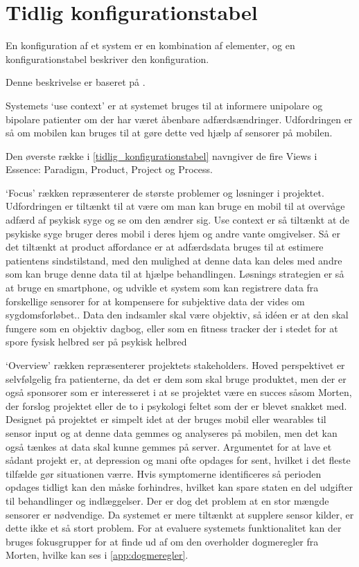 \section{Tidlig konfigurationstabel}
En konfiguration af et system er en kombination af elementer, og en konfigurationstabel beskriver den konfiguration.

Denne beskrivelse er baseret på  \citet[Afsnit 3.2, Side 16-21]{art:essence}.

Systemets `use context' er at systemet bruges til at informere unipolare og bipolare patienter om der har været åbenbare adfærdsændringer. Udfordringen er så om mobilen kan bruges til at gøre dette ved hjælp af sensorer på mobilen.

Den øverste række i \cref{tidlig_konfigurationstabel} navngiver de fire Views i Essence: Paradigm, Product, Project og Process.

`Focus' rækken repræsenterer de største problemer og løsninger i projektet. 
Udfordringen er tiltænkt til at være om man kan bruge en mobil til at overvåge adfærd af psykisk syge og se om den ændrer sig. 
Use context er så tiltænkt at de psykiske syge bruger deres mobil i deres hjem og andre vante omgivelser. 
Så er det tiltænkt at product affordance er at adfærdsdata bruges til at estimere patientens sindstilstand, med den mulighed at denne data kan deles med andre som kan bruge denne data til at hjælpe behandlingen. 
Løsnings strategien er så at bruge en smartphone, og udvikle et system som kan registrere data fra forskellige sensorer for at kompensere for subjektive data der vides om sygdomsforløbet..
Data den indsamler skal være objektiv, så idéen er at den skal fungere som en objektiv dagbog, eller som en fitness tracker der i stedet for at spore fysisk helbred ser på psykisk helbred 

`Overview' rækken repræsenterer projektets stakeholders. 
Hoved perspektivet er selvfølgelig fra patienterne, da det er dem som skal bruge produktet, men der er også sponsorer som er interesseret i at se projektet være en succes såsom Morten, der forslog projektet eller de to i psykologi feltet som der er blevet snakket med. 
Designet på projektet er simpelt idet at der bruges mobil eller wearables til sensor input og at denne data gemmes og analyseres på mobilen, men det kan også tænkes at data skal kunne gemmes på server. 
Argumentet for at lave et sådant projekt er, at depression og mani ofte opdages for sent, hvilket i det fleste tilfælde gør situationen værre.
Hvis symptomerne identificeres så perioden opdages tidligt kan den måske forhindres, hvilket kan spare staten en del udgifter til behandlinger og indlæggelser.
Der er dog det problem at en stor mængde sensorer er nødvendige.
Da systemet er mere tiltænkt at supplere sensor kilder, er dette ikke et så stort problem.
For at evaluere systemets funktionalitet kan der bruges fokusgrupper for at finde ud af om den overholder dogmeregler fra Morten, hvilke kan ses i \cref{app:dogmeregler}.

